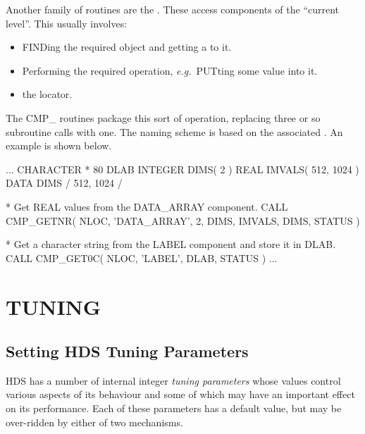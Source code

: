 \documentclass[twoside,11pt]{starlink}
\providecommand{\qt}[1]{``#1''}
\providecommand{\st}[1]{{\emph{#1}}}
\begin{document}
Another family of routines are the . These access components of the
\qt{current level}. This usually involves:

\begin{itemize}

\item FINDing the required object and getting a  to it.

\item Performing the required operation, \st{e.g.}\ PUTting some
value into it.

\item {} the locator.

\end{itemize}

The CMP\_ routines package this sort of operation, replacing three or so
subroutine calls with one. The naming scheme is based on the
associated . An example is
shown below.

\begin{small}
\begin{terminalv}
      ...
      CHARACTER * 80 DLAB
      INTEGER DIMS( 2 )
      REAL IMVALS( 512, 1024 )
      DATA DIMS / 512, 1024 /

*  Get REAL values from the DATA_ARRAY component.
      CALL CMP_GETNR( NLOC, 'DATA_ARRAY', 2, DIMS, IMVALS, DIMS, STATUS )

*  Get a character string from the LABEL component and store it in DLAB.
      CALL CMP_GET0C( NLOC, 'LABEL', DLAB, STATUS )
      ...
\end{terminalv}
\end{small}

\section{\label{sect:tuning}TUNING}

\subsection{Setting HDS Tuning Parameters}

HDS has a number of internal integer \st{tuning parameters} whose
values control various aspects of its behaviour and some of which may
have an important effect on its performance. Each of these parameters
has a default value, but may be over-ridden by either of two
mechanisms.
\end{document}
